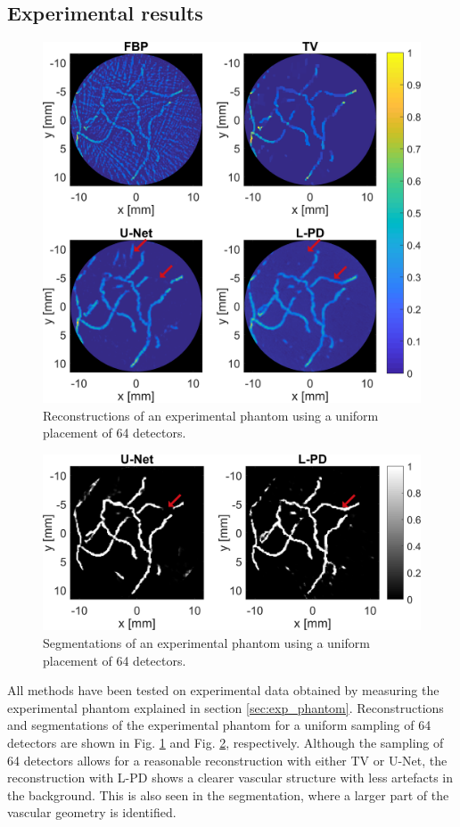 \documentclass[journal]{IEEEtran}
\begin{document}
\subsection{Experimental results}
\begin{figure}[ht!]
\centering
\includegraphics[width=\linewidth]{images/paper_exp_uni_recon.png}
\caption{Reconstructions of an experimental phantom using a uniform placement of 64 detectors.}
\label{fig:exp_uni_recon}
\end{figure}
\begin{figure}[ht!]
\centering
\includegraphics[width=\linewidth]{images/paper_exp_uni_segm.png}
\caption{Segmentations of an experimental phantom using a uniform placement of 64 detectors.}
\label{fig:exp_uni_segm}\vspace{-3mm}
\end{figure}
All methods have been tested on experimental data obtained by measuring the experimental phantom explained in section \ref{sec:exp_phantom}. Reconstructions and segmentations of the experimental phantom for a uniform sampling of 64 detectors are shown in Fig. \ref{fig:exp_uni_recon} and Fig. \ref{fig:exp_uni_segm}, respectively. Although the sampling of 64 detectors allows for a reasonable reconstruction with either TV or U-Net, the reconstruction with L-PD shows a clearer vascular structure with less artefacts in the background. This is also seen in the segmentation, where a larger part of the vascular geometry is identified. 
\end{document}
